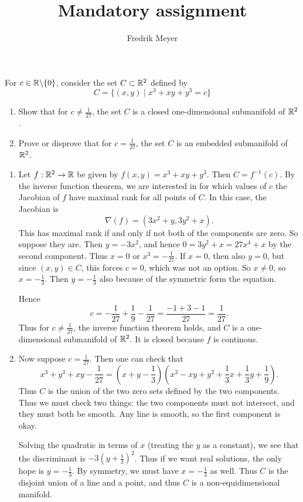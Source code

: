 \documentclass[11pt, english]{article}
\begin{document}
\title{Mandatory assignment}
\author{Fredrik Meyer}
\maketitle 


\begin{exc}
  For $c \in \mathbb{R} \backslash \{ 0 \}$, consider the set $C \subset \mathbb{R}^2$ defined by
\[
C = \{ (x,y) \mid x^3+xy+y^3=c \}
\]
\begin{enumerate}
\item Show that for $c \neq \frac 1{27}$, the set $C$ is a closed one-dimensional submanifold of $\mathbb{R}^2$.
\item Prove or disprove that for $c=\frac 1{27}$, the set $C$ is an embedded submanifold of $\mathbb{R}^2$. 
\end{enumerate}
\end{exc}

\begin{sol}
  \begin{enumerate}
  \item Let $f:\mathbb{R}^2 \to \mathbb{R}$ be given by $f(x,y)=x^3+xy+y^3$. Then $C=f^{-1}(c)$. By the inverse function theorem, we are interested in for which values of $c$ the Jacobian of $f$ have maximal rank for all points of $C$. In this case, the Jacobian is 
\[
\nabla(f) = \left( 3x^2+y , 3y^2+x \right).
\]
This has maximal rank if and only if not both of the components are zero. So suppose they are. Then $y=-3x^2$, and hence $0=3y^2+x=27x^4+x$ by the second component. Thus $x=0$ or $x^3=-\frac{1}{27}$. If $x=0$, then also $y=0$, but since $(x,y) \in C$, this forces $c=0$, which was not an option. So $x \neq 0$, so $x=-\frac 13$. Then $y=-\frac 13$ also because of the symmetric form the equation.

Hence
$$
c = -\frac 1{27} + \frac 19 - \frac 1{27} = \frac{-1+3-1}{27}=\frac{1}{27}.
$$
Thus for $c \neq \frac 1{27}$, the inverse function theorem holds, and $C$ is a one-dimensional submanifold of $\mathbb{R}^2$. It is closed because $f$ is continous.

\item Now suppose $c=\frac 1 {27}$. Then one can check that 
\[
x^3+y^3+xy-\frac{1}{27}=(x+y-\frac 13)(x^2-xy+y^2+\frac 13 x + \frac 13 y + \frac 19).
\]
Thus $C$ is the union of the two zero sets defined by the two components. Thus we must check two things: the two components must not intersect, and they must both be smooth. Any line is smooth, so the first component is okay.

Solving the quadratic in terms of $x$ (treating the $y$ as a constant), we see that the discriminant is $-3(y+\frac 13)^2$. Thus if we want real solutions, the only hope is $y=-\frac 13$. By symmetry, we must have $x=-\frac 13$ as well. Thus $C$ is the disjoint union of a line and a point, and thus $C$ is a non-equidimensional manifold.
  \end{enumerate}
\end{sol}
\end{document}
